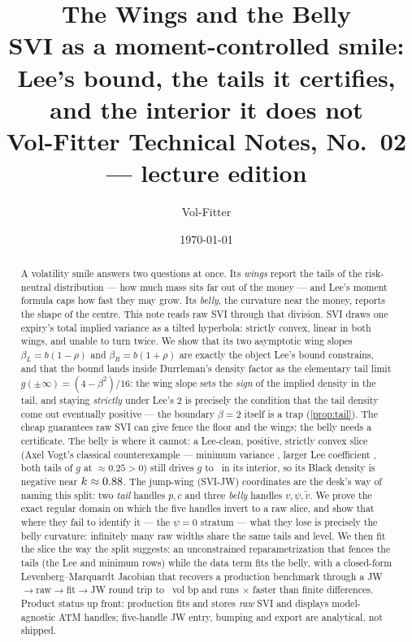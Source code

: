 \documentclass[11pt]{article}
\title{\textbf{The Wings and the Belly}\\[2pt]
\large SVI as a moment-controlled smile: Lee's bound, the tails it certifies,
and the interior it does not\\[2pt]
\normalsize Vol-Fitter Technical Notes, No.~02 --- lecture edition}
\author{Vol-Fitter}
\date{\today}
\newcommand{\vmin}{\widetilde v}    %
\newcommand{\betL}{\beta_L}
\newcommand{\betR}{\beta_R}
\begin{document}
\maketitle



\begin{abstract}
A volatility smile answers two questions at once.  Its \emph{wings} report the
tails of the risk-neutral distribution --- how much mass sits far out of the
money --- and Lee's moment formula caps how fast they may grow.  Its
\emph{belly}, the curvature near the money, reports the shape of the centre.
This note reads raw SVI through that division.  SVI draws one expiry's total
implied variance as a tilted hyperbola: strictly convex, linear in both wings,
and unable to turn twice.  We show that its two asymptotic wing slopes
$\betL=b(1-\rho)$ and $\betR=b(1+\rho)$ are exactly the object Lee's bound
constrains, and that the bound lands inside Durrleman's density factor as the
elementary tail limit $g(\pm\infty)=(4-\beta^2)/16$: the wing slope sets the
\emph{sign} of the implied density in the tail, and staying \emph{strictly}
under Lee's $2$ is precisely the condition that the tail density come out
eventually positive --- the boundary $\beta=2$ itself is a trap
(\cref{prop:tail}).  The cheap guarantees raw SVI can give fence the
floor and the wings; the belly needs a certificate.  The belly is where it
cannot: a Lee-clean, positive, strictly convex slice (Axel Vogt's classical
counterexample --- minimum variance \svimomcountermin, larger Lee coefficient
\svimomcounterlee, both tails of $g$ at $\approx0.25>0$) still drives $g$ to
\svimomcounterg\ in its interior, so its Black density is negative near
$k\approx0.88$.  The jump-wing (SVI-JW) coordinates are the desk's
way of naming this split: two \emph{tail} handles $p,c$ and three \emph{belly}
handles $v,\psi,\vmin$.  We prove the exact regular domain on which the
five handles invert to a raw slice, and show that where they fail to identify
it --- the $\psi=0$ stratum --- what they lose is precisely the belly curvature:
infinitely many raw widths share the same tails and level.  We then fit the
slice the way the split suggests: an unconstrained reparametrization that fences
the tails (the Lee and minimum rows) while the data term fits the belly, with a
closed-form Levenberg--Marquardt Jacobian that recovers a production benchmark
through a JW$\to$raw$\to$fit$\to$JW round trip to \svimommaxerr\ vol bp and runs
\svimomspeedup$\times$ faster than finite differences.  Product status up front:
production fits and stores \emph{raw} SVI and displays model-agnostic ATM
handles; five-handle JW entry, bumping and export are analytical, not shipped.
\end{abstract}
\end{document}
